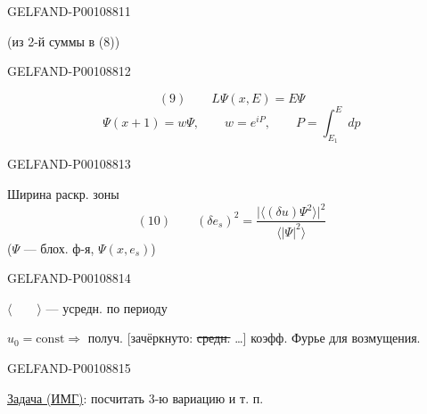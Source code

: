 \begin{GelfandAdjacentEvidence}{GELFAND-P001088}{11}

(из 2-й суммы в (8))
\end{GelfandAdjacentEvidence}
\begin{GelfandAdjacentEvidence}{GELFAND-P001088}{12}


\[
(9)\qquad L\Psi(x,E)=E\Psi
\]
\[
\Psi(x+1)=w\Psi,\qquad w=e^{iP},\qquad P=\int_{E_1}^{E}dp
\]
\end{GelfandAdjacentEvidence}
\begin{GelfandAdjacentEvidence}{GELFAND-P001088}{13}


Ширина раскр. зоны
\[
(10)\qquad
(\delta e_s)^2=
\frac{\bigl|\langle(\delta u)\Psi^2\rangle\bigr|^2}{\langle|\Psi|^2\rangle}
\]
($\Psi$ — блох. ф-я, $\Psi(x,e_s)$)
\end{GelfandAdjacentEvidence}
\begin{GelfandAdjacentEvidence}{GELFAND-P001088}{14}


$\langle\qquad\rangle$ — усредн. по периоду

$u_0=\mathrm{const}\Rightarrow$ получ. [зачёркнуто: \sout{средн.} …] коэфф. Фурье для возмущения.
\end{GelfandAdjacentEvidence}
\begin{GelfandAdjacentEvidence}{GELFAND-P001088}{15}


\uline{Задача (ИМГ)}: посчитать 3-ю вариацию и т. п.
\end{GelfandAdjacentEvidence}



